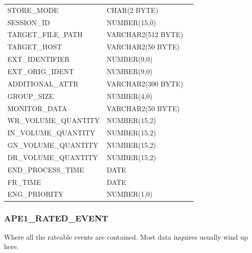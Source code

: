\documentclass[12pt,twoside]{article}
\begin{document}
\begin{longtable}{lll}
 STORE\_MODE                   &  CHAR(2 BYTE)        &               \\
 SESSION\_ID                   &  NUMBER(15,0)        &               \\
 TARGET\_FILE\_PATH            &  VARCHAR2(512 BYTE)  &               \\
 TARGET\_HOST                  &  VARCHAR2(50 BYTE)   &               \\
 EXT\_IDENTIFIER               &  NUMBER(9,0)         &               \\
 EXT\_ORIG\_IDENT              &  NUMBER(9,0)         &               \\
 ADDITIONAL\_ATTR              &  VARCHAR2(300 BYTE)  &               \\
 GROUP\_SIZE                   &  NUMBER(4,0)         &               \\
 MONITOR\_DATA                 &  VARCHAR2(50 BYTE)   &               \\
 WR\_VOLUME\_QUANTITY          &  NUMBER(15,2)        &               \\
 IN\_VOLUME\_QUANTITY          &  NUMBER(15,2)        &               \\
 GN\_VOLUME\_QUANTITY          &  NUMBER(15,2)        &               \\
 DR\_VOLUME\_QUANTITY          &  NUMBER(15,2)        &               \\
 END\_PROCESS\_TIME            &  DATE                &               \\
 FR\_TIME                      &  DATE                &               \\
 ENG\_PRIORITY                 &  NUMBER(1,0)         &               \\
\hline
\end{longtable}

\normalsize
\subsubsection{APE1\_RATED\_EVENT}
\label{sec-8-3-3}

    Where all the rateable events are contained. Most data inquires
    usually wind up here.
\end{document}
